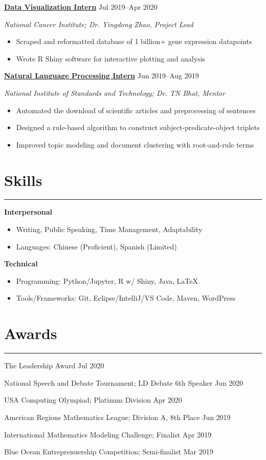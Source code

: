 \documentclass[11pt]{article}
\newcommand{\resumesection}[1]{\vspace{-0.3cm}\section*{\color{highlight}#1}\vspace{-0.3cm}\hrule\vspace{0.3cm}}
\begin{document}
\textbf{\href{https://github.com/petezh/TP-Workbench}{Data Visualization Intern}} \hfill Jul 2019--Apr 2020 \par
\textit{National Cancer Institute; Dr. Yingdong Zhao, Project Lead}
\begin{itemize}
	\item Scraped and reformatted database of 1 billion+ gene expression datapoints
	\item Wrote R Shiny software for interactive plotting and analysis
\end{itemize}\vspace{0.1cm}

\textbf{\href{https://github.com/petezh/Root-and-Rule-NLP}{Natural Language Processing Intern}} \hfill Jun 2019--Aug 2019\par
\textit{National Institute of Standards and Technology; Dr. TN Bhat, Mentor}
\begin{itemize}
	\item Automated the download of scientific articles and preprocessing of sentences
	\item Designed a rule-based algorithm to construct subject-predicate-object triplets
	\item Improved topic modeling and document clustering with root-and-rule terms
\end{itemize}\vspace{0.1cm}

\resumesection{Skills}

\textbf{Interpersonal}
\begin{itemize} 
	\item Writing, Public Speaking, Time Management, Adaptability
	\item Languages: Chinese (Proficient), Spanish (Limited)
\end{itemize}\vspace{0.1cm}

\textbf{Technical}
\begin{itemize} 
	\item Programming: Python/Jupyter, R w/ Shiny, Java, \LaTeX
	\item Tools/Frameworks: Git, Eclipse/IntelliJ/VS Code, Maven, WordPress
\end{itemize}\vspace{0.1cm}

\resumesection{Awards}

The Leadership Award \hfill Jul 2020 \par
National Speech and Debate Tournament; LD Debate 6th Speaker \hfill Jun 2020 \par
USA Computing Olympiad; Platinum Division \hfill Apr 2020 \par
American Regions Mathematics League; Division A, 8th Place \hfill Jun 2019 \par
International Mathematics Modeling Challenge; Finalist \hfill Apr 2019\par
Blue Ocean Entreprenuership Competition; Semi-finalist \hfill Mar 2019 \par
\end{document}
